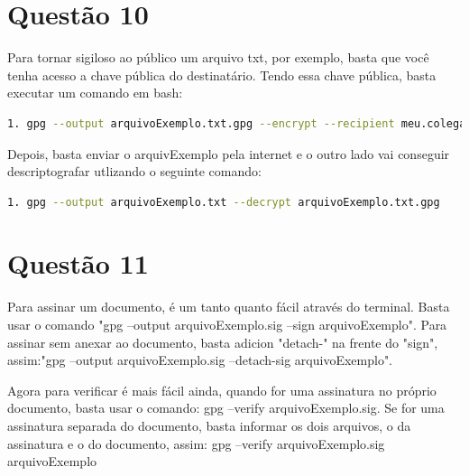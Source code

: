 \documentclass[openany]{ufsctex/ufsctex}
\begin{document}
\section{Questão 10} 
	Para tornar sigiloso ao público um arquivo txt, por exemplo, basta que você tenha acesso a chave pública do destinatário. Tendo essa chave pública, basta executar um comando em bash: 
		
\begin{lstlisting}[language=bash,breaklines=true, tabsize=2,basicstyle =\fontsize{9}{11}]
  1. gpg --output arquivoExemplo.txt.gpg --encrypt --recipient meu.colega.deturma@ufsc.br.com  arquivoExemplo.txt
\end{lstlisting}

	Depois, basta enviar o arquivExemplo pela internet e o outro lado vai conseguir descriptografar utlizando o seguinte comando:
			
\begin{lstlisting}[language=bash,breaklines=true, tabsize=2,basicstyle =\fontsize{9}{11}]
  1. gpg --output arquivoExemplo.txt --decrypt arquivoExemplo.txt.gpg 
\end{lstlisting}

	
\section{Questão 11}
	Para assinar um documento, é um tanto quanto fácil através do terminal. Basta usar o comando "gpg --output arquivoExemplo.sig --sign arquivoExemplo". Para assinar sem anexar ao documento, basta adicion "detach-" na frente do "sign", assim:"gpg --output arquivoExemplo.sig --detach-sig arquivoExemplo".
	
	
	Agora para verificar é mais fácil ainda, quando for uma assinatura no próprio documento, basta usar o comando: gpg --verify arquivoExemplo.sig. Se for uma assinatura separada do documento, basta informar os dois arquivos, o da assinatura e o do documento, assim: gpg --verify arquivoExemplo.sig arquivoExemplo
	

	
\end{document}
